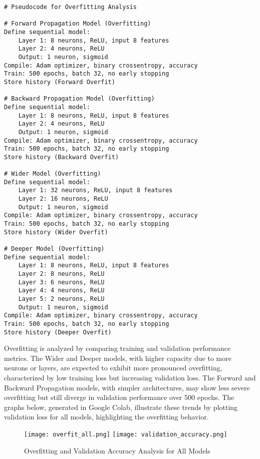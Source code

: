 \documentclass[a4paper,12pt]{article}
\begin{document}
\begin{verbatim}
# Pseudocode for Overfitting Analysis

# Forward Propagation Model (Overfitting)
Define sequential model:
    Layer 1: 8 neurons, ReLU, input 8 features
    Layer 2: 4 neurons, ReLU
    Output: 1 neuron, sigmoid
Compile: Adam optimizer, binary crossentropy, accuracy
Train: 500 epochs, batch 32, no early stopping
Store history (Forward Overfit)

# Backward Propagation Model (Overfitting)
Define sequential model:
    Layer 1: 8 neurons, ReLU, input 8 features
    Layer 2: 4 neurons, ReLU
    Output: 1 neuron, sigmoid
Compile: Adam optimizer, binary crossentropy, accuracy
Train: 500 epochs, batch 32, no early stopping
Store history (Backward Overfit)

# Wider Model (Overfitting)
Define sequential model:
    Layer 1: 32 neurons, ReLU, input 8 features
    Layer 2: 16 neurons, ReLU
    Output: 1 neuron, sigmoid
Compile: Adam optimizer, binary crossentropy, accuracy
Train: 500 epochs, batch 32, no early stopping
Store history (Wider Overfit)

# Deeper Model (Overfitting)
Define sequential model:
    Layer 1: 8 neurons, ReLU, input 8 features
    Layer 2: 8 neurons, ReLU
    Layer 3: 6 neurons, ReLU
    Layer 4: 4 neurons, ReLU
    Layer 5: 2 neurons, ReLU
    Output: 1 neuron, sigmoid
Compile: Adam optimizer, binary crossentropy, accuracy
Train: 500 epochs, batch 32, no early stopping
Store history (Deeper Overfit)
\end{verbatim}

Overfitting is analyzed by comparing training and validation performance metrics. The Wider and Deeper models, with higher capacity due to more neurons or layers, are expected to exhibit more pronounced overfitting, characterized by low training loss but increasing validation loss. The Forward and Backward Propagation models, with simpler architectures, may show less severe overfitting but still diverge in validation performance over 500 epochs. The graphs below, generated in Google Colab, illustrate these trends by plotting validation loss for all models, highlighting the overfitting behavior.

\begin{figure}[h]
    \centering
    \texttt{[image: overfit\_all.png]}
    \texttt{[image: validation\_accuracy.png]}
    \caption{Overfitting and Validation Accuracy Analysis for All Models}
\end{figure}
\end{document}
